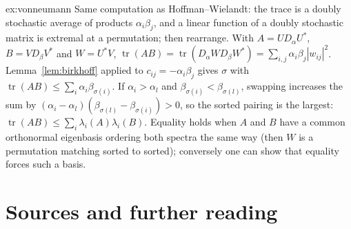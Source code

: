 \begin{solution}{ex:vonneumann}
\idea Same computation as Hoffman--Wielandt: the trace is a doubly stochastic average of products $\alpha_i\beta_j$, and
a linear function of a doubly stochastic matrix is extremal at a permutation; then rearrange.
\writeup With $A=UD_\alpha U^*$, $B=VD_\beta V^*$ and $W=U^*V$, $\operatorname{tr}(AB)=\operatorname{tr}(D_\alpha WD_\beta
W^*)=\sum_{i,j}\alpha_i\beta_j|w_{ij}|^2$. Lemma~\ref{lem:birkhoff} applied to $c_{ij}=-\alpha_i\beta_j$ gives $\sigma$ with
$\operatorname{tr}(AB)\le\sum_i\alpha_i\beta_{\sigma(i)}$. If $\alpha_i>\alpha_l$ and $\beta_{\sigma(i)}<\beta_{\sigma(l)}$,
swapping increases the sum by $(\alpha_i-\alpha_l)(\beta_{\sigma(l)}-\beta_{\sigma(i)})>0$, so the sorted pairing is the
largest: $\operatorname{tr}(AB)\le\sum_i\lambda_i(A)\lambda_i(B)$. Equality holds when $A$ and $B$ have a common orthonormal
eigenbasis ordering both spectra the same way (then $W$ is a permutation matching sorted to sorted); conversely one can show
that equality forces such a basis.
\end{solution}

\section*{Sources and further reading}

